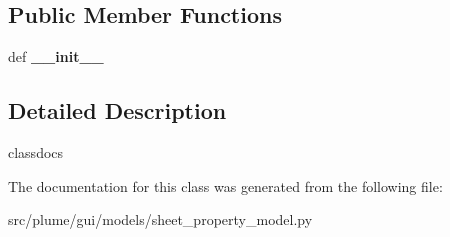 \subsection*{Public Member Functions}
\begin{DoxyCompactItemize}
\item 
def {\bfseries \+\_\+\+\_\+init\+\_\+\+\_\+}\hypertarget{classplume-creator_1_1src_1_1plume_1_1gui_1_1models_1_1sheet__property__model_1_1_sheet_property_model_a5d0526d3cf81f95ae2060f2e6632d302}{}\label{classplume-creator_1_1src_1_1plume_1_1gui_1_1models_1_1sheet__property__model_1_1_sheet_property_model_a5d0526d3cf81f95ae2060f2e6632d302}

\end{DoxyCompactItemize}


\subsection{Detailed Description}
classdocs 

The documentation for this class was generated from the following file\+:\begin{DoxyCompactItemize}
\item 
src/plume/gui/models/sheet\+\_\+property\+\_\+model.\+py\end{DoxyCompactItemize}
